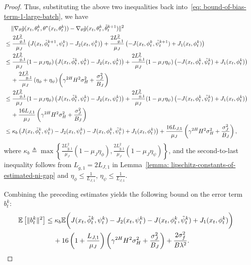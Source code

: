 \documentclass{article}
\theoremstyle{plain}
\theoremstyle{definition}
\theoremstyle{remark}
\def\E{\mathbb E}
\def\bydef{\triangleq}
\begin{document}
\begin{proof}
    Thus, substituting the above two inequalities back into~\eqref{eq: bound-of-bias-term-1-large-batch}, we have
    \begin{align}
         &  \quad \, \|\nabla_\theta \tilde{g}(x_t,\theta_t^k,\theta^*(x_t,\theta_t^k)) -  \nabla_\theta \tilde{g}(x_t,\theta_t^k, \tilde{\theta}_t^{k+1})  \|^2 \notag  \\
        & \leq \frac{2L^2_{\widetilde{g},1}}{\mu_J} \left( J(x_t,\tilde{\phi}_t^{k+1},\psi_t^k) - J_2(x_t,\psi_t^k) \right) + \frac{2L^2_{\widetilde{g},1}}{\mu_J} \left( - J(x_t,\phi_t^k,\tilde{\psi}_t^{k+1}) + J_1(x_t,\phi_t^k) \right) \notag\\
        & \leq \frac{2L^2_{\widetilde{g},1}}{\mu_J}(1 -\mu_J \eta_\phi) \left( J(x_t,\tilde{\phi}_t^{k},\psi_t^k) - J_2(x_t,\psi_t^k) \right) + \frac{2L^2_{\widetilde{g},1}}{\mu_J}(1 - \mu_J \eta_\psi) \left( - J(x_t,\phi_t^k,\tilde{\psi}_t^{k}) + J_1(x_t,\phi_t^k) \right) \notag \\
        & \quad \, + \frac{2L^2_{\widetilde{g},1}}{\mu_J} \left( \eta_\phi + \eta_\psi\right) \left( \gamma^{2H} H^2 \sigma_H^2 + \frac{\sigma_J^2}{B_{J}} \right) \notag \\
        & \leq \frac{2L^2_{\widetilde{g},1}}{\mu_J}(1 -\mu_J \eta_\phi) \left( J(x_t,\tilde{\phi}_t^{k},\psi_t^k) - J_2(x_t,\psi_t^k) \right) + \frac{2L^2_{\widetilde{g},1}}{\mu_J}(1 - \mu_J \eta_\psi) \left( - J(x_t,\phi_t^k,\tilde{\psi}_t^{k}) + J_1(x_t,\phi_t^k) \right) \notag \\
        & \quad \, + \frac{16 L_{J,1}}{\mu_J} \left( \gamma^{2H} H^2 \sigma_H^2 + \frac{\sigma_J^2}{B_{J}} \right)  \notag \\ 
        & \leq \kappa_b \left( J(x_t,\tilde{\phi}_t^{k},\psi_t^k) - J_2(x_t,\psi_t^k) - J(x_t,\phi_t^k,\tilde{\psi}_t^{k}) + J_1(x_t,\phi_t^k) \right)  + \frac{16 L_{J,1}}{\mu_J} \left( \gamma^{2H} H^2 \sigma_H^2 + \frac{\sigma_J^2}{B_{J}} \right),
    \end{align}
     where $\kappa_b \bydef \max\left\{\frac{2L^2_{\widetilde{g},1}}{\mu_J}(1 -\mu_J \eta_\phi), \frac{2L^2_{\widetilde{g},1}}{\mu_J}(1 - \mu_J \eta_\psi) \right\}$, and the second-to-last inequality follows from $L_{\widetilde{g},1} = 2 L_{J,1}$ in Lemma~\ref{lemma: lipschitz-constants-of-estimated-ni-gap} and $\eta_\phi \leq \frac{1}{L_{J,1}}$, $\eta_\psi \leq \frac{1}{L_{J,1}}$.

  Combining the preceding estimates yields the following bound on the error term $b_t^k$:
    \begin{align}
        \E \left[ \| b_t^k\|^2 \right] 
        & \leq \kappa_b \E \bigg( J(x_t,\tilde{\phi}_t^{k},\psi_t^k) - J_2(x_t,\psi_t^k)  - J(x_t,\phi_t^k,\tilde{\psi}_t^{k}) + J_1(x_t,\phi_t^k) \bigg)  \notag \\
        & \quad \, + 16\left( 1 + \frac{L_{J,1}}{\mu_J}\right) \left( \gamma^{2H} H^2 \sigma_H^2 + \frac{\sigma_J^2}{B_J} \right)+ \frac{2\sigma_f^2}{B\lambda^2} . \label{eq: bound-of-error-btk-large-batch} 
    \end{align}



\end{proof}
\end{document}
